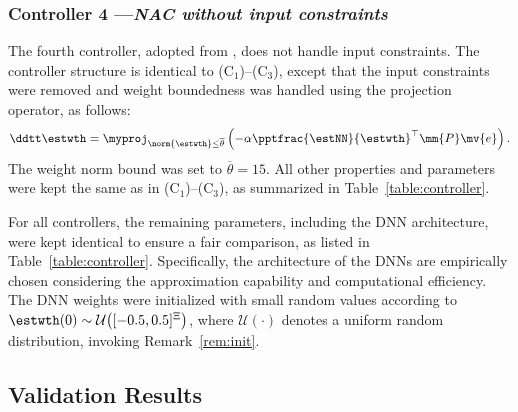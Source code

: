 \documentclass[letterpaper, journal]{IEEEtran}
\begin{document}
\subsubsection*{Controller 4 —\textit{NAC without input constraints}}

The fourth controller, adopted from \cite{Patil:2022aa}, does not handle input constraints.
The controller structure is identical to (C$_1$)--(C$_3$), except that the input constraints were removed and weight boundedness was handled using the projection operator, as follows:
\begin{equation}
    \ddtt\estwth
    =
    \myproj_{\norm{\estwth}\le\overline{\theta}}
    \left(
        -\alpha
        \pptfrac{\estNN}{\estwth}^\top
        \mm{P}
        \mv{e}
    \right)
    .
\end{equation}
The weight norm bound was set to $\overline{\theta}=15$.
All other properties and parameters were kept the same as in (C$_1$)--(C$_3$), as summarized in Table~\ref{table:controller}.

\hfill

For all controllers, the remaining parameters, including the DNN architecture, were kept identical to ensure a fair comparison, as listed in Table~\ref{table:controller}.
Specifically, the architecture of the DNNs are empirically chosen considering the approximation capability and computational efficiency.
The DNN weights were initialized with small random values according to $\estwth(0)\sim\mathcal{U}\bigl([-0.5,0.5]^{\Xi}\bigr)$, where $\mathcal{U}(\cdot)$ denotes a uniform random distribution, invoking Remark~\ref{rem:init}.

\subsection{Validation Results} \label{sec:val:results}
\end{document}
